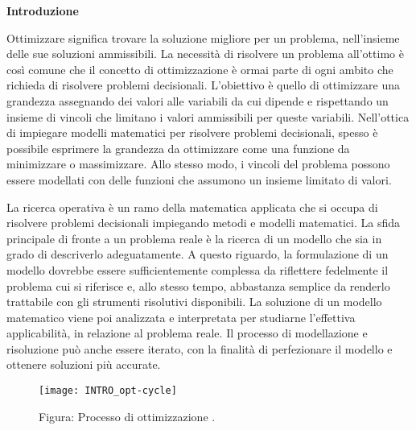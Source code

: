 \thispagestyle{empty}
\begin{center}
    \vspace*{3cm}\alt\bfseries\fortypt Introduzione\\[15pt]
\end{center}
%
%
Ottimizzare significa trovare la soluzione migliore per un problema,
nell'insieme delle sue soluzioni ammissibili. La necessità di risolvere un
problema all'ottimo è così comune che il concetto di ottimizzazione è ormai
parte di ogni ambito che richieda di risolvere problemi decisionali.
L'obiettivo è quello di ottimizzare una grandezza assegnando dei valori
alle variabili da cui dipende e rispettando un insieme di vincoli che
limitano i valori ammissibili per queste variabili.  Nell'ottica di
impiegare modelli matematici per risolvere problemi decisionali, spesso è
possibile esprimere la grandezza da ottimizzare come una funzione da
minimizzare o massimizzare. Allo stesso modo, i vincoli del problema
possono essere modellati con delle funzioni che assumono un insieme
limitato di valori.

La ricerca operativa è un ramo della matematica applicata che si occupa di
risolvere problemi decisionali impiegando metodi e modelli matematici.
La sfida principale di fronte a un problema reale è la ricerca di un modello
che sia in grado di descriverlo adeguatamente. A questo riguardo, la
formulazione di un modello dovrebbe essere sufficientemente complessa da
riflettere fedelmente il problema cui si riferisce e, allo stesso tempo,
abbastanza semplice da renderlo trattabile con gli strumenti risolutivi
disponibili. La soluzione di un modello matematico viene poi analizzata e
interpretata per studiarne l'effettiva applicabilità, in relazione al
problema reale. Il processo di modellazione e risoluzione può anche essere
iterato, con la finalità di perfezionare il modello e ottenere soluzioni
più accurate.

\begin{figure}[h]
    \centering
    \texttt{[image: INTRO\_opt-cycle]}
    \caption*{Figura: Processo di ottimizzazione \cite{GITO}.}
    \label{fig:INTRO_opt-cycle}
\end{figure}

